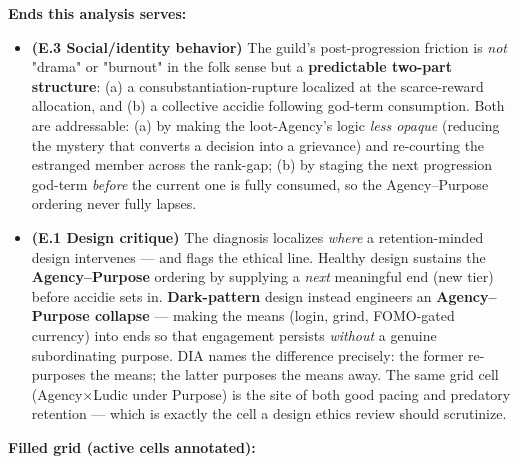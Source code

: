 \documentclass[11pt]{report}
\begin{document}
\textbf{Ends this analysis serves:}


\begin{itemize}
\item \textbf{(E.3 Social/identity behavior)} The guild's post-progression friction is \textit{not} "drama" or "burnout" in the folk sense but a \textbf{predictable two-part structure}: (a) a consubstantiation-rupture localized at the scarce-reward allocation, and (b) a collective accidie following god-term consumption. Both are addressable: (a) by making the loot-Agency's logic \textit{less opaque} (reducing the mystery that converts a decision into a grievance) and re-courting the estranged member across the rank-gap; (b) by staging the next progression god-term \textit{before} the current one is fully consumed, so the Agency–Purpose ordering never fully lapses.
\item \textbf{(E.1 Design critique)} The diagnosis localizes \textit{where} a retention-minded design intervenes — and flags the ethical line. Healthy design sustains the \textbf{Agency–Purpose} ordering by supplying a \textit{next} meaningful end (new tier) before accidie sets in. \textbf{Dark-pattern} design instead engineers an \textbf{Agency–Purpose collapse} — making the means (login, grind, FOMO-gated currency) into ends so that engagement persists \textit{without} a genuine subordinating purpose. DIA names the difference precisely: the former re-purposes the means; the latter purposes the means away. The same grid cell (Agency$\times$\allowbreak Ludic under Purpose) is the site of both good pacing and predatory retention — which is exactly the cell a design ethics review should scrutinize.
\end{itemize}


\textbf{Filled grid (active cells annotated):}
\end{document}
